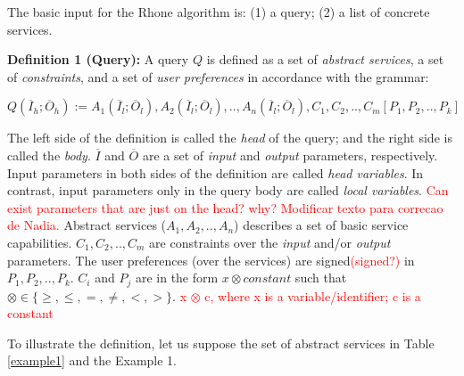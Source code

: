 
The basic input for the Rhone algorithm is: (1) a query; (2) a list of concrete services.

\noindent \textbf{Definition 1 (Query):} 
A query $Q$ is defined as a set of \textit{abstract services}, a set of \textit{constraints}, and a set of \textit{user preferences} in accordance with the grammar: 

\begin{center}

\begin{math}
Q (\overline{I}_{h}; \overline{O}_{h}) := A_{1}(\overline{I}_{l}; \overline{O}_{l}), A_{2}(\overline{I}_{l}; \overline{O}_{l}), ..,  A_{n}(\overline{I}_{l}; \overline{O}_{l}),C_{1},C_{2}, .., C_{m}[P_{1},P_{2}, .., P_{k}]
\end{math}

\end{center}


The left side of the definition is called the \textit{head} of the query; and the right side is called the \textit{body}. 
$\overline{I}$ and $\overline{O}$ are a set of \textit{input} and \textit{output} parameters, respectively.
Input parameters in both sides of the definition are called \textit{head variables}.
In contrast, input parameters only in the query body are called \textit{local variables}.
\textcolor{red}{Can exist parameters that are just on the head? why? Modificar texto para correcao de Nadia.}
Abstract services ($A_{1}, A_{2}, .., A_{n}$) describes a set of basic service capabilities.
$C_{1}, C_{2}, .., C_{m}$ are constraints over the \textit{input} and/or \textit{output} parameters.
The user preferences (over the services) are signed\textcolor{red}{(signed?)} in $P_{1}, P_{2}, .., P_{k}$. $C_{i}$ and $P_{j}$ are in the form $x \otimes constant$ such that $\otimes \in\lbrace \geq, \leq, =, \neq, <, >\rbrace$.
\textcolor{red}{x $\otimes$ c, where x is a variable/identifier; c is a constant}

To illustrate the definition, let us suppose the set of abstract services in Table \ref{example1} and the Example 1.

